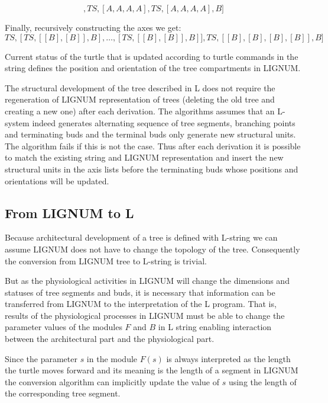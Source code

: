 \begin{equation}
[TS, [], TS, [A,A,A,A], TS, [A,A,A,A], B]
\end{equation}

Finally, recursively constructing the axes we get:
\begin{equation}
[TS, [] TS,[TS,[[B],[B]],B],\ldots, [TS,[[B],[B]],B]], TS, [[B],[B],[B],[B]], B]
\end{equation}

Current  status of  the turtle  that  is updated  according to  turtle
commands in  the string  defines the position  and orientation  of the
tree compartments in LIGNUM.

The structural development of the tree described in L does not require
the regeneration  of LIGNUM representation of trees  (deleting the old
tree and  creating a new  one) after each derivation.   The algorithms
assumes that an L-system indeed generates alternating sequence of tree
segments, branching points and  terminating buds and the terminal buds
only generate  new structural units.   The algorithm fails if  this is
not the case.  Thus after each  derivation it is possible to match the
existing  string   and  LIGNUM  representation  and   insert  the  new
structural units in  the axis lists before the  terminating buds whose
positions and orientations will be updated.


\subsection{From LIGNUM to L}\label{sec:LignumToL}

Because architectural  development of a tree is  defined with L-string
we can assume LIGNUM does not have to change the topology of the tree.
Consequently the conversion from LIGNUM tree to L-string is trivial.
  
But  as the  physiological activities  in  LIGNUM \citep{perttunen:96}
will change the dimensions and  statuses of tree segments and buds, it
is necessary  that information can  be transferred from LIGNUM  to the
interpretation   of  the   L program.    That  is,   results  of   the
physiological processes in LIGNUM must be able to change the parameter
values of  the modules  $F$ and $B$  in L string  enabling interaction
between the architectural part and the physiological part.

Since the parameter $s$ in  the module $F(s)$ is always interpreted as
the length the turtle moves forward and its meaning is the length of a
segment in  LIGNUM the conversion algorithm can  implicitly update the
value of $s$ using the length of the corresponding tree segment.

